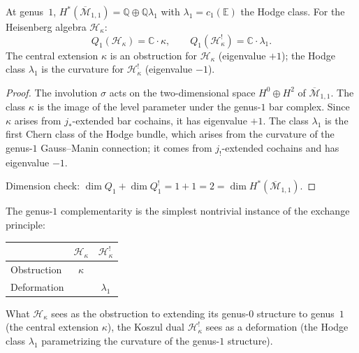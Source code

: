 \begin{proposition}
\label{prop:thqg-III-genus-1}
At genus~$1$,
$H^*(\overline{\mathcal{M}}_{1,1})
= \mathbb{Q} \oplus \mathbb{Q}\lambda_1$
with $\lambda_1 = c_1(\mathbb{E})$ the Hodge class.
For the Heisenberg algebra $\mathcal{H}_\kappa$:
\begin{equation}%
Q_1(\mathcal{H}_\kappa) = \mathbb{C} \cdot \kappa,
\qquad
Q_1(\mathcal{H}_\kappa^!) = \mathbb{C} \cdot \lambda_1.
\end{equation}
The central extension $\kappa$ is an obstruction for
$\mathcal{H}_\kappa$ (eigenvalue $+1$); the Hodge class
$\lambda_1$ is the curvature for $\mathcal{H}_\kappa^!$
(eigenvalue $-1$).
\end{proposition}

\begin{proof}
The involution $\sigma$ acts on the
two-dimensional space $H^0 \oplus H^2$ of
$\overline{\mathcal{M}}_{1,1}$. The class $\kappa$ is the
image of the level parameter under the genus-$1$ bar
complex. Since $\kappa$
arises from $j_*$-extended bar cochains, it has eigenvalue
$+1$. The class $\lambda_1$ is the first Chern class of
the Hodge bundle, which arises from the curvature of the
genus-$1$ Gauss--Manin connection; it comes from $j_!$-extended
cochains and has eigenvalue $-1$.

Dimension check: $\dim Q_1 + \dim Q_1^! = 1 + 1 = 2
= \dim H^*(\overline{\mathcal{M}}_{1,1})$.
\end{proof}

\begin{remark}
The genus-$1$ complementarity is the simplest nontrivial
instance of the exchange principle:
\begin{center}
\begin{tabular}{l@{\quad}c@{\quad}c}
& $\mathcal{H}_\kappa$ & $\mathcal{H}_\kappa^!$ \\
\midrule
Obstruction & $\kappa$ & \\
Deformation & & $\lambda_1$ \\
\end{tabular}
\end{center}
What $\mathcal{H}_\kappa$ sees as the obstruction to
extending its genus-$0$ structure to genus~$1$ (the
central extension $\kappa$), the Koszul dual
$\mathcal{H}_\kappa^!$ sees as a deformation (the Hodge
class $\lambda_1$ parametrizing the curvature of the
genus-$1$ structure).
\end{remark}

